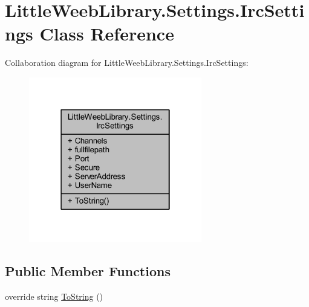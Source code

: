 \hypertarget{class_little_weeb_library_1_1_settings_1_1_irc_settings}{}\section{Little\+Weeb\+Library.\+Settings.\+Irc\+Settings Class Reference}
\label{class_little_weeb_library_1_1_settings_1_1_irc_settings}


Collaboration diagram for Little\+Weeb\+Library.\+Settings.\+Irc\+Settings\+:\nopagebreak
\begin{figure}[H]
\begin{center}
\leavevmode
\includegraphics[width=214pt]{class_little_weeb_library_1_1_settings_1_1_irc_settings__coll__graph}
\end{center}
\end{figure}
\subsection*{Public Member Functions}
\begin{DoxyCompactItemize}
\item 
override string \mbox{\hyperlink{class_little_weeb_library_1_1_settings_1_1_irc_settings_a2e1d7f26d7d3083d19c3a9e6c6c2d0b2}{To\+String}} ()
\end{DoxyCompactItemize}
